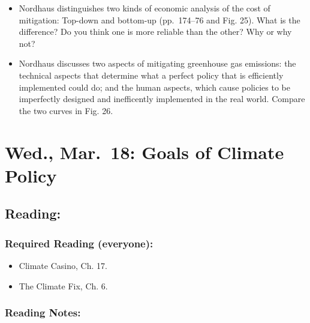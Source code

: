 \documentclass[
]{article}
\providecommand{\tightlist}{%
  \setlength{\itemsep}{0pt}\setlength{\parskip}{0pt}}
\begin{document}
\begin{itemize}
\tightlist
\item
  Nordhaus distinguishes two kinds of economic analysis of the cost of
  mitigation: Top-down and bottom-up (pp.~174--76 and Fig. 25). What is
  the difference? Do you think one is more reliable than the other? Why
  or why not?
\item
  Nordhaus discusses two aspects of mitigating greenhouse gas emissions:
  the technical aspects that determine what a perfect policy that is
  efficiently implemented could do; and the human aspects, which cause
  policies to be imperfectly designed and inefficently implemented in
  the real world. Compare the two curves in Fig. 26.
\end{itemize}

\hypertarget{wed.-mar.-18-goals-of-climate-policy}{%
\section{Wed., Mar.~18: Goals of Climate
Policy}\label{wed.-mar.-18-goals-of-climate-policy}}

\hypertarget{reading-27}{%
\subsection{Reading:}\label{reading-27}}

\hypertarget{required-reading-everyone-22}{%
\subsubsection{Required Reading
(everyone):}\label{required-reading-everyone-22}}

\begin{itemize}
\tightlist
\item
  Climate Casino, Ch. 17.
\item
  The Climate Fix, Ch. 6.
\end{itemize}

\hypertarget{reading-notes-22}{%
\subsubsection{Reading Notes:}\label{reading-notes-22}}
\end{document}
